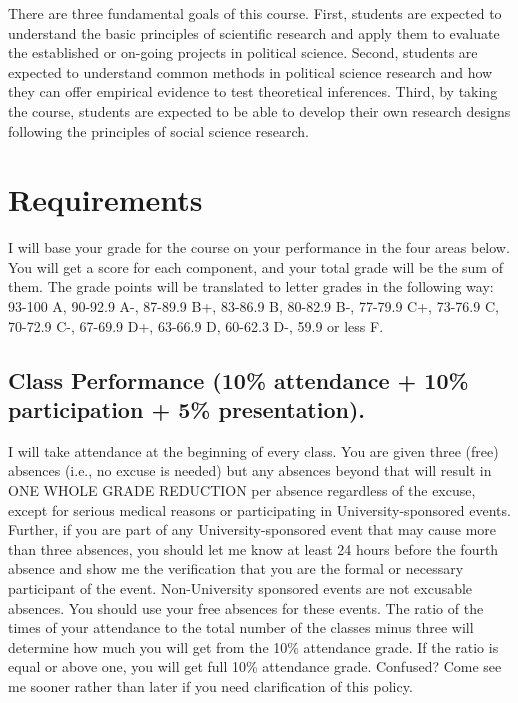 \documentclass[11pt,]{article}
\theoremstyle{definition}
\theoremstyle{definition}
\theoremstyle{remark}
\begin{document}
There are three fundamental goals of this course. First, students are
expected to understand the basic principles of scientific research and
apply them to evaluate the established or on-going projects in political
science. Second, students are expected to understand common methods in
political science research and how they can offer empirical evidence to
test theoretical inferences. Third, by taking the course, students are
expected to be able to develop their own research designs following the
principles of social science research.

\section{Requirements}\label{requirements}

I will base your grade for the course on your performance in the four
areas below. You will get a score for each component, and your total
grade will be the sum of them. The grade points will be translated to
letter grades in the following way: 93-100 A, 90-92.9 A-, 87-89.9 B+,
83-86.9 B, 80-82.9 B-, 77-79.9 C+, 73-76.9 C, 70-72.9 C-, 67-69.9 D+,
63-66.9 D, 60-62.3 D-, 59.9 or less F.

\subsection{Class Performance (10\% attendance + 10\% participation +
5\%
presentation).}\label{class-performance-10-attendance-10-participation-5-presentation.}

I will take attendance at the beginning of every class. You are given
three (free) absences (i.e., no excuse is needed) but any absences
beyond that will result in ONE WHOLE GRADE REDUCTION per absence
regardless of the excuse, except for serious medical reasons or
participating in University-sponsored events. Further, if you are part
of any University-sponsored event that may cause more than three
absences, you should let me know at least 24 hours before the fourth
absence and show me the verification that you are the formal or
necessary participant of the event. Non-University sponsored events are
not excusable absences. You should use your free absences for these
events. The ratio of the times of your attendance to the total number of
the classes minus three will determine how much you will get from the
10\% attendance grade. If the ratio is equal or above one, you will get
full 10\% attendance grade. Confused? Come see me sooner rather than
later if you need clarification of this policy.
\end{document}
